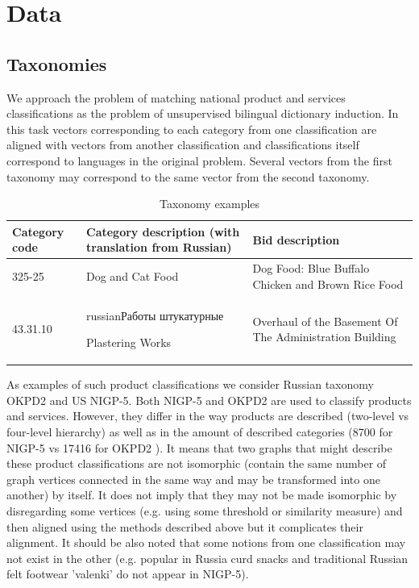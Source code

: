 \documentclass[11pt,a4paper]{article}
\begin{document}
\section{Data}
\subsection{Taxonomies}
We approach the problem of matching national product and services classifications as the problem of unsupervised bilingual dictionary induction. In this task vectors corresponding to each category from one classification are aligned with vectors from another classification and classifications itself correspond to languages in the original problem. Several vectors from the first taxonomy may correspond to the same vector from the second taxonomy.

\begin{center}
	\begin{table}[!htbp]
		\small
		\caption{Taxonomy examples}
		\label{table-taxonomies}		
		\centering
		\begin{tabular}{|p{1cm}|p{2.5cm}|p{2.5cm}|}
			\hline
			Category code & Category description \newline (with translation from Russian) & Bid description\\
			\hline
			325-25 & Dog and Cat Food & Dog Food: Blue Buffalo Chicken and Brown Rice Food\\
			\hline
			43.31.10 & \begin{otherlanguage*}{russian}Работы штукатурные\end{otherlanguage*} \newline Plastering Works & Overhaul of the Basement Of The Administration Building\\
			\hline
		\end{tabular}
	\end{table}
\end{center}

As examples of such product classifications we consider Russian taxonomy OKPD2 and US NIGP-5.
Both NIGP-5 and OKPD2 are used to classify products and services. However, they differ in the way products are described (two-level vs four-level hierarchy) as well as in the amount of described categories (8700 for NIGP-5 \cite{wiki-nigp} vs 17416 for OKPD2 \cite{wiki-okpd}). It means that two graphs that might describe these product classifications are not isomorphic (contain the same number of graph vertices connected in the same way and may be transformed into one another) by itself.  It does not imply that they may not be made isomorphic by disregarding some vertices (e.g. using some threshold or similarity measure) and then aligned using the methods described above but it complicates their alignment. It should be also noted that some notions from one classification may not exist in the other (e.g. popular in Russia curd snacks and traditional Russian felt footwear 'valenki' do not appear in NIGP-5).
\end{document}
